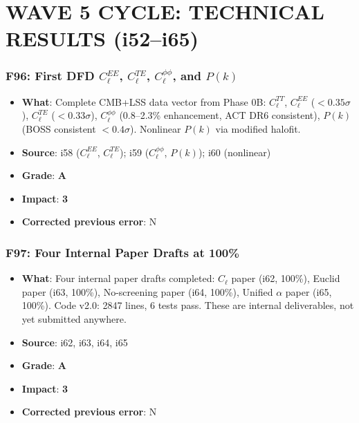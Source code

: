 \documentclass[11pt,a4paper]{article}
\newcommand{\grade}[1]{\textbf{#1}}
\newcommand{\impact}[1]{\textbf{#1}}
\begin{document}
\part{WAVE 5 CYCLE: TECHNICAL RESULTS (i52--i65)}
\label{part:wave5technical}

\section{F96: First DFD $C_\ell^{EE}$, $C_\ell^{TE}$, $C_\ell^{\phi\phi}$, and $P(k)$}
\begin{itemize}[nosep]
\item \textbf{What}: Complete CMB+LSS data vector from Phase 0B: $C_\ell^{TT}$, $C_\ell^{EE}$ ($< 0.35\sigma$), $C_\ell^{TE}$ ($< 0.33\sigma$), $C_\ell^{\phi\phi}$ (0.8--2.3\% enhancement, ACT DR6 consistent), $P(k)$ (BOSS consistent $< 0.4\sigma$). Nonlinear $P(k)$ via modified halofit.
\item \textbf{Source}: i58 ($C_\ell^{EE}$, $C_\ell^{TE}$); i59 ($C_\ell^{\phi\phi}$, $P(k)$); i60 (nonlinear)
\item \textbf{Grade}: \grade{A}
\item \textbf{Impact}: \impact{3}
\item \textbf{Corrected previous error}: N
\end{itemize}

\section{F97: Four Internal Paper Drafts at 100\%}
\begin{itemize}[nosep]
\item \textbf{What}: Four internal paper drafts completed: $C_\ell$ paper (i62, 100\%), Euclid paper (i63, 100\%), No-screening paper (i64, 100\%), Unified $\alpha$ paper (i65, 100\%). Code v2.0: 2847 lines, 6 tests pass. These are internal deliverables, not yet submitted anywhere.
\item \textbf{Source}: i62, i63, i64, i65
\item \textbf{Grade}: \grade{A}
\item \textbf{Impact}: \impact{3}
\item \textbf{Corrected previous error}: N
\end{itemize}
\end{document}
